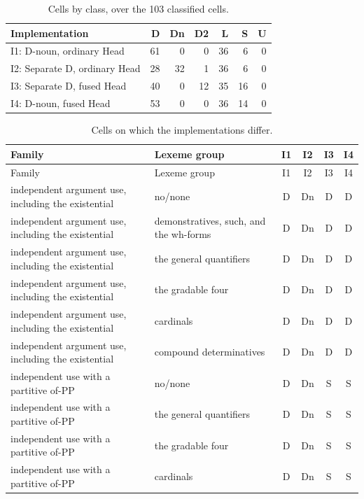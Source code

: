 \begin{table}[H]\centering\small
\caption{Cells by class, over the 103 classified cells.}\label{tab:counts}
\begin{tabular}{lrrrrrr}
\toprule
Implementation & D & Dn & D2 & L & S & U \\
\midrule
I1: D-noun, ordinary Head & 61 & 0 & 0 & 36 & 6 & 0 \\
I2: Separate D, ordinary Head & 28 & 32 & 1 & 36 & 6 & 0 \\
I3: Separate D, fused Head & 40 & 0 & 12 & 35 & 16 & 0 \\
I4: D-noun, fused Head & 53 & 0 & 0 & 36 & 14 & 0 \\
\bottomrule
\end{tabular}
\end{table}

{\small
\begin{longtable}{>{\raggedright\arraybackslash}p{5.2cm}>{\raggedright\arraybackslash}p{4.2cm}cccc}
\caption{Cells on which the implementations differ.}\label{tab:differ}\\
\toprule
Family & Lexeme group & I1 & I2 & I3 & I4 \\
\midrule
\endfirsthead
\toprule
Family & Lexeme group & I1 & I2 & I3 & I4 \\
\midrule
\endhead
\bottomrule
\endfoot
independent argument use, including the existential & no/none & D & Dn & D & D \\
independent argument use, including the existential & demonstratives, such, and the wh-forms & D & Dn & D & D \\
independent argument use, including the existential & the general quantifiers & D & Dn & D & D \\
independent argument use, including the existential & the gradable four & D & Dn & D & D \\
independent argument use, including the existential & cardinals & D & Dn & D & D \\
independent argument use, including the existential & compound determinatives & D & Dn & D & D \\
independent use with a partitive of-PP & no/none & D & Dn & S & S \\
independent use with a partitive of-PP & the general quantifiers & D & Dn & S & S \\
independent use with a partitive of-PP & the gradable four & D & Dn & S & S \\
independent use with a partitive of-PP & cardinals & D & Dn & S & S \\

\end{longtable}}
